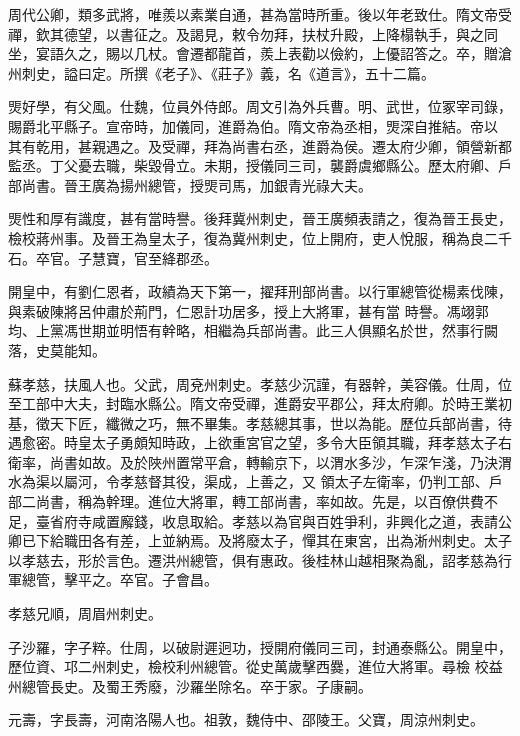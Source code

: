 \begin{pinyinscope}
 周代公卿，類多武將，唯羨以素業自通，甚為當時所重。後以年老致仕。隋文帝受禪，欽其德望，以書征之。及謁見，敕令勿拜，扶杖升殿，上降榻執手，與之同坐，宴語久之，賜以几杖。會遷都龍首，羨上表勸以儉約，上優詔答之。卒，贈滄州刺史，謚曰定。所撰《老子》、《莊子》義，名《道言》，五十二篇。



 煚好學，有父風。仕魏，位員外侍郎。周文引為外兵曹。明、武世，位冢宰司錄，賜爵北平縣子。宣帝時，加儀同，進爵為伯。隋文帝為丞相，煚深自推結。帝以
 其有乾用，甚親遇之。及受禪，拜為尚書右丞，進爵為侯。遷太府少卿，領營新都監丞。丁父憂去職，柴毀骨立。未期，授儀同三司，襲爵虞鄉縣公。歷太府卿、戶部尚書。晉王廣為揚州總管，授煚司馬，加銀青光祿大夫。



 煚性和厚有識度，甚有當時譽。後拜冀州刺史，晉王廣頻表請之，復為晉王長史，檢校蔣州事。及晉王為皇太子，復為冀州刺史，位上開府，吏人悅服，稱為良二千石。卒官。子慧寶，官至絳郡丞。



 開皇中，有劉仁恩者，政績為天下第一，擢拜刑部尚書。以行軍總管從楊素伐陳，與素破陳將呂仲肅於荊門，仁恩計功居多，授上大將軍，甚有當
 時譽。馮翊郭均、上黨馮世期並明悟有幹略，相繼為兵部尚書。此三人俱顯名於世，然事行闕落，史莫能知。



 蘇孝慈，扶風人也。父武，周兗州刺史。孝慈少沉謹，有器幹，美容儀。仕周，位至工部中大夫，封臨水縣公。隋文帝受禪，進爵安平郡公，拜太府卿。於時王業初基，徵天下匠，纖微之巧，無不畢集。孝慈總其事，世以為能。歷位兵部尚書，待遇愈密。時皇太子勇頗知時政，上欲重宮官之望，多令大臣領其職，拜孝慈太子右衛率，尚書如故。及於陜州置常平倉，轉輸京下，以渭水多沙，乍深乍淺，乃決渭水為渠以屬河，令孝慈督其役，渠成，上善之，又
 領太子左衛率，仍判工部、戶部二尚書，稱為幹理。進位大將軍，轉工部尚書，率如故。先是，以百僚供費不足，臺省府寺咸置廨錢，收息取給。孝慈以為官與百姓爭利，非興化之道，表請公卿已下給職田各有差，上並納焉。及將廢太子，憚其在東宮，出為淅州刺史。太子以孝慈去，形於言色。遷洪州總管，俱有惠政。後桂林山越相聚為亂，詔孝慈為行軍總管，擊平之。卒官。子會昌。



 孝慈兄順，周眉州刺史。



 子沙羅，字子粹。仕周，以破尉遲迥功，授開府儀同三司，封通泰縣公。開皇中，歷位資、邛二州刺史，檢校利州總管。從史萬歲擊西爨，進位大將軍。尋檢
 校益州總管長史。及蜀王秀廢，沙羅坐除名。卒于家。子康嗣。



 元壽，字長壽，河南洛陽人也。祖敦，魏侍中、邵陵王。父寶，周涼州刺史。




\end{pinyinscope}
